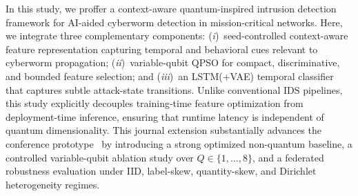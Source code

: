\documentclass[conference]{IEEEtran}
\begin{document}
In this study, we proffer a context-aware quantum-inspired intrusion detection framework for AI-aided cyberworm detection in mission-critical networks. Here, we integrate three complementary
components: (\textit{i})~seed-controlled context-aware feature representation capturing temporal and behavioral cues relevant to
cyberworm propagation; (\textit{ii})~variable-qubit QPSO for compact, discriminative, and bounded feature selection; and
(\textit{iii})~an LSTM(+VAE) temporal classifier that captures subtle attack-state transitions. Unlike conventional IDS pipelines, this study explicitly decouples training-time feature optimization from
deployment-time inference, ensuring that runtime latency is independent of quantum dimensionality. This journal extension substantially advances
the conference prototype~\cite{ajakweconquest} by introducing a strong
optimized non-quantum baseline, a controlled variable-qubit ablation study over $Q\in\{1,\dots,8\}$, and a federated robustness evaluation under IID, label-skew, quantity-skew, and Dirichlet heterogeneity regimes.
\end{document}
